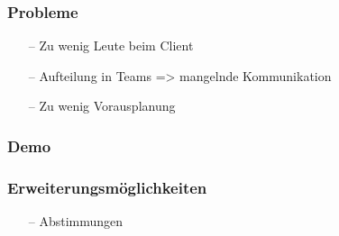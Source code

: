 \documentclass[aspectratio=1610]{beamer}
\begin{document}
    \begin{frame}[plain]
        \frametitle{\textbf{Probleme}}
        \begin{itemize}
            \item[--] Zu wenig Leute beim Client
            \item[--] Aufteilung in Teams => mangelnde Kommunikation
            \item[--] Zu wenig Vorausplanung
        \end{itemize}
    \end{frame}


  \begin{frame}[plain]
      \frametitle{\textbf{Demo}}

  \end{frame}

  \begin{frame}[plain]
      \frametitle{\textbf{Erweiterungsmöglichkeiten}}
        \begin{itemize}
          \item[--] Abstimmungen
        \end{itemize}
  \end{frame}
  
\end{document}
